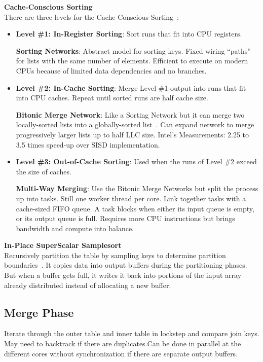 \documentclass[11pt]{article}
\begin{document}
\textbf{Cache-Conscious Sorting}\\
There are three levels for the Cache-Conscious Sorting~\cite{Kim2009}:
\begin{itemize}
	\item \textbf{Level \#1: In-Register Sorting}: Sort runs that fit into CPU registers.
	
	\textbf{Sorting Networks}: Abstract model for sorting keys. Fixed wiring “paths” for lists with the same number of elements. Efficient to execute on modern CPUs because of limited data dependencies and no branches.
	
	\item \textbf{Level \#2: In-Cache Sorting}: Merge Level \#1 output into runs that fit into CPU caches. Repeat until sorted runs are half cache size.
	
	\textbf{Bitonic Merge Network}: Like a Sorting Network but it can merge two locally-sorted lists into a globally-sorted list~\cite{Chhugani2008}. Can expand network to merge progressively larger lists up to half LLC size. Intel’s Measurements: 2.25 to 3.5 times speed-up over SISD implementation.
	
	
	\item \textbf{Level \#3: Out-of-Cache Sorting}: Used when the runs of Level \#2 exceed the size of caches.
	
	\textbf{Multi-Way Merging}: Use the Bitonic Merge Networks but split the process up into tasks. Still one worker thread per core. Link together tasks with a cache-sized FIFO queue. A task blocks when either its input queue is empty, or its output queue is full. Requires more CPU instructions but brings bandwidth and compute into balance.
\end{itemize}

\textbf{In-Place SuperScalar Samplesort}\\
Recursively partition the table by sampling keys to determine partition boundaries~\cite{Axtmann2017}. It copies data into output buffers during the partitioning phases. But when a buffer gets full, it writes it back into portions of the input array already distributed instead of allocating a new buffer.


\subsection*{Merge Phase}
Iterate through the outer table and inner table in lockstep and compare join keys. May need to backtrack if there are duplicates.Can be done in parallel at the different cores without synchronization if there are separate output buffers.
\end{document}
